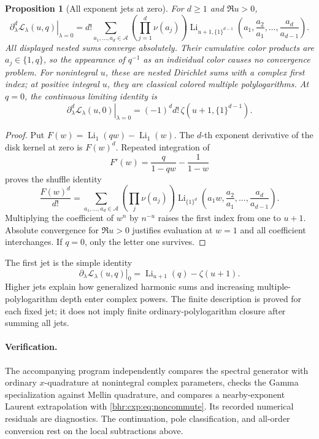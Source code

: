 \documentclass[11pt]{article}
\numberwithin{equation}{section}
\theoremstyle{plain}
\newtheorem{proposition}[theorem]{Proposition}
\theoremstyle{definition}
\theoremstyle{remark}
\begin{document}
\begin{proposition}[All exponent jets at zero]
\label{bhr:cxp:prop:jets}
For \(d\ge1\) and \(\Re u>0\),
\begin{equation}\label{bhr:cxp:eq:MPL}
 \left.\partial_\lambda^d\mathcal L_\lambda(u,q)
                                      \right|_{\lambda=0}
 =d!\sum_{a_1,\ldots,a_d\in\mathcal A}
 \left(\prod_{j=1}^d\nu(a_j)\right)
 \operatorname{Li}_{u+1,\{1\}^{d-1}}
       \left(a_1,\frac{a_2}{a_1},\ldots,
                                \frac{a_d}{a_{d-1}}\right).
\end{equation}
All displayed nested sums converge absolutely.  Their cumulative
color products are \(a_j\in\{1,q\}\), so the appearance of
\(q^{-1}\) as an individual color causes no convergence problem.
For nonintegral \(u\), these are nested Dirichlet sums with a complex first index; at positive integral \(u\), they are classical colored multiple polylogarithms.
At \(q=0\), the continuous limiting identity is
\[
 \left.\partial_\lambda^d\mathcal L_\lambda(u,0)
                                      \right|_{\lambda=0}
       =(-1)^d d!\,\zeta(u+1,\{1\}^{d-1}).
\]
\end{proposition}

\begin{proof}
Put \(F(w)=\operatorname{Li}_1(qw)-\operatorname{Li}_1(w)\).
The \(d\)-th exponent derivative of the disk kernel at zero is
\(F(w)^d\).  Repeated integration of
\[
 F'(w)=\frac{q}{1-qw}-\frac1{1-w}
\]
proves the shuffle identity
\[
 \frac{F(w)^d}{d!}
 =\sum_{a_1,\ldots,a_d\in\mathcal A}
   \left(\prod_j\nu(a_j)\right)
 \operatorname{Li}_{\{1\}^d}
     \left(a_1w,\frac{a_2}{a_1},\ldots,
                                   \frac{a_d}{a_{d-1}}\right).
\]
Multiplying the coefficient of \(w^n\) by \(n^{-u}\) raises
the first index from one to \(u+1\).  Absolute convergence for
\(\Re u>0\) justifies evaluation at \(w=1\) and all coefficient
interchanges.  If \(q=0\), only the letter one survives.
\end{proof}

The first jet is the simple identity
\[
 \left.\partial_\lambda\mathcal L_\lambda(u,q)\right|_0
       =\operatorname{Li}_{u+1}(q)-\zeta(u+1).
\]
Higher jets explain how generalized harmonic sums and increasing
multiple-polylogarithm depth enter complex powers.  The finite
description is proved for each fixed jet; it does not imply finite
ordinary-polylogarithm closure after summing all jets.

\paragraph{Verification.}
The accompanying program independently compares the spectral
generator with ordinary \(x\)-quadrature at nonintegral complex
parameters, checks the Gamma specialization against Mellin
quadrature, and compares a nearby-exponent Laurent extrapolation
with \eqref{bhr:cxp:eq:noncommute}.  Its recorded numerical residuals
are diagnostics.  The continuation, pole classification, and
all-order conversion rest on the local subtractions above.
\end{document}
